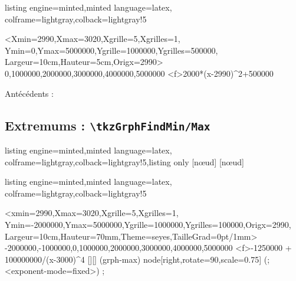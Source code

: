 \documentclass[11pt,a4paper]{ltxdoc}
\begin{document}
\begin{tcblisting}{listing engine=minted,minted language=latex,
  colframe=lightgray,colback=lightgray!5}
\begin{tkzGrph}%
    <Xmin=2990,Xmax=3020,Xgrille=5,Xgrilles=1,
    Ymin=0,Ymax=5000000,Ygrille=1000000,Ygrilles=500000,
    Largeur=10cm,Hauteur=5cm,Origx=2990>
    {0,1000000,2000000,3000000,4000000,5000000}
  \tkzGrphDefineCurve[trace,name=cf,color=red]<f>{2000*(x-2990)^2+500000}
\end{tkzGrph}

Antécédents : \ANTS
\end{tcblisting}

\subsection{Extremums : \texttt{\textbackslash tkzGrphFindMin/Max}}

\begin{tcblisting}{listing engine=minted,minted language=latex,
  colframe=lightgray,colback=lightgray!5,listing only}
[nœud]
[nœud]
\end{tcblisting}

\begin{tcblisting}{listing engine=minted,minted language=latex,
  colframe=lightgray,colback=lightgray!5}
\begin{tkzGrph}%
  <xmin=2990,Xmax=3020,Xgrille=5,Xgrilles=1,%
  Ymin=-2000000,Ymax=5000000,Ygrille=1000000,Ygrilles=100000,Origx=2990,%
  Largeur=10cm,Hauteur=70mm,Theme=seyes,TailleGrad=0pt/1mm>
  {-2000000,-1000000,0,1000000,2000000,3000000,4000000,5000000}
  \tkzGrphDefineCurve[name=cf,trace,forbiddenvalues={3000}]%
    <f>{-1250000 + 100000000/(x-3000)^4}
  [\mylocalxmax][\mylocalymax]
  \draw[teal] (grph-max) node[right,rotate=90,scale=0.75] {(\ArrondirNum[0]{\mylocalxmax};\ArrondirNum[0]<exponent-mode=fixed>{\mylocalymax})} ;
\end{tkzGrph}
\end{tcblisting}
\end{document}
